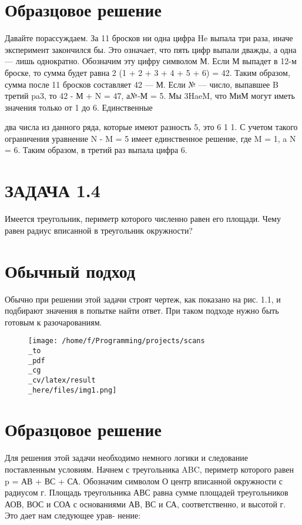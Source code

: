 \section{Образцовое решение}

Давайте порассуждаем. За 11 бросков ни одна цифра He выпала три раза, иначе эксперимент закончился бы. Это означает, что пять цифр выпали дважды, а одна — лишь однократно. Обозначим эту цифру символом М. Если М выпадет в 12-м броске, то сумма будет равна 2 (1 + 2 + 3 + 4 + 5 + 6) = 42. Таким образом, сумма после 11 бросков составляет 42 — М. Если № — число, выпавшее B третий pa3, то 42 - М + N = 47, а№-М = 5. Мы 3HaeM, что МиМ могут иметь значения только от 1 до 6. Единственные

два числа из данного ряда, которые имеют разность 5, это 6 1 1. С учетом такого ограничения уравнение N - M = 5 имеет единственное решение, где M = 1, a N = 6. Таким образом, в третий раз выпала цифра 6.

\section{ЗАДАЧА 1.4}

Имеется треугольник, периметр которого численно равен его площади. Чему равен радиус вписанной в треугольник окружности?

\section{Обычный подход}

Обычно при решении этой задачи строят чертеж, как показано на рис. 1.1, и подбирают значения в попытке найти ответ. При таком подходе нужно быть готовым к разочарованиям.


\begin{figure}[!h]
\centering
\texttt{[image: /home/f/Programming/projects/scans\\\_to\\\_pdf\\\_cg\\\_cv/latex/result\\\_here/files/img1.png]}
\caption{}
\end{figure}
        

\section{Образцовое решение}

Для решения этой задачи необходимо немного логики и следование поставленным условиям. Начнем с треугольника ABC, периметр которого равен p = АВ + ВС + СА. Обозначим символом О центр вписанной окружности с радиусом г. Площадь треугольника АВС равна сумме площадей треугольников АОВ, ВОС и СОА с основаниями АВ, ВС и СА, соответственно, и высотой г. Это дает нам следующее урав- нение:


